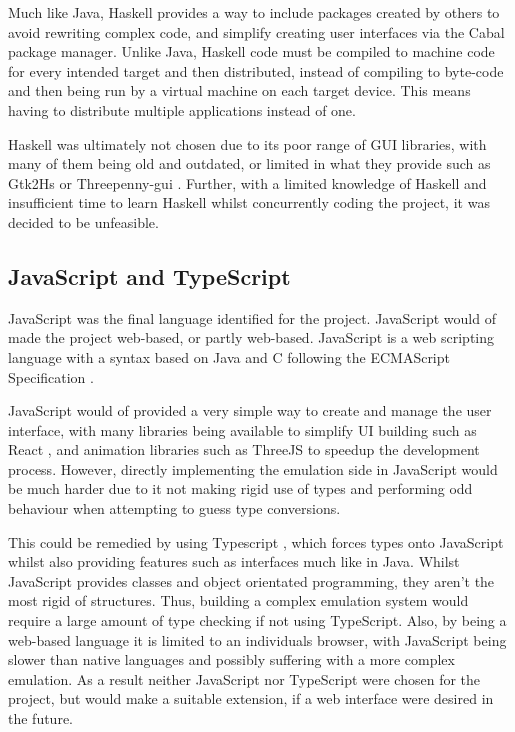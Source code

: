 Much like Java, Haskell provides a way to include packages created by others to avoid rewriting complex code, and simplify creating user interfaces via the Cabal \cite{haskell_2023_the} package manager. Unlike Java, Haskell code must be compiled to machine code for every intended target and then distributed, instead of compiling to byte-code and then being run by a virtual machine on each target device. This means having to distribute multiple applications instead of one.

Haskell was ultimately not chosen due to its poor range of GUI libraries, with many of them being old and outdated, or limited in what they provide such as Gtk2Hs \cite{haskell_2023_gtk2hs} or Threepenny-gui \cite{threepennygui_2017_about}. Further, with a limited knowledge of Haskell and insufficient time to learn Haskell whilst concurrently coding the project, it was decided to be unfeasible.

\subsection{JavaScript and TypeScript}
JavaScript was the final language identified for the project. JavaScript would of made the project web-based, or partly web-based. JavaScript is a web scripting language with a syntax based on Java and C following the ECMAScript Specification \cite{ecmainternational_2023_ecmascript}.

JavaScript would of provided a very simple way to create and manage the user interface, with many libraries being available to simplify \ac{UI} building such as React \cite{metaopensource_2023_react}, and animation libraries such as ThreeJS \cite{cabello_2023_threejs} to speedup the development process. However, directly implementing the emulation side in JavaScript would be much harder due to it not making rigid use of types and performing odd behaviour when attempting to guess type conversions.

This could be remedied by using Typescript \cite{microsoftcorporation_2020_javascript}, which forces types onto JavaScript whilst also providing features such as interfaces much like in Java. Whilst JavaScript provides classes and object orientated programming, they aren't the most rigid of structures. Thus, building a complex emulation system would require a large amount of type checking if not using TypeScript. Also, by being a web-based language it is limited to an individuals browser, with JavaScript being slower than native languages and possibly suffering with a more complex emulation. As a result neither JavaScript nor TypeScript were  chosen for the project, but would make a suitable extension, if a web interface were desired in the future.

